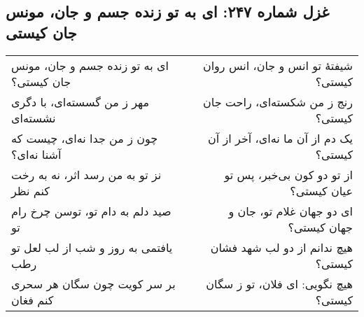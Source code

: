 \begin{center}
\section*{غزل شماره ۲۴۷: ای به تو زنده جسم و جان، مونس جان کیستی}
\label{sec:247}
\begin{longtable}{l p{0.5cm} r}
ای به تو زنده جسم و جان، مونس جان کیستی؟
&&
شیفتهٔ تو انس و جان، انس روان کیستی؟
\\
مهر ز من گسسته‌ای، با دگری نشسته‌ای
&&
رنج ز من شکسته‌ای، راحت جان کیستی؟
\\
چون ز من جدا نه‌ای، چیست که آشنا نه‌ای؟
&&
یک دم از آن ما نه‌ای، آخر از آن کیستی؟
\\
نز تو به من رسد اثر، نه به رخت کنم نظر
&&
از تو دو کون بی‌خبر، پس تو عیان کیستی؟
\\
صید دلم به دام تو، توسن چرخ رام تو
&&
ای دو جهان غلام تو، جان و جهان کیستی؟
\\
یافتمی به روز و شب از لب لعل تو رطب
&&
هیچ ندانم از دو لب شهد فشان کیستی؟
\\
بر سر کویت چون سگان هر سحری کنم فغان
&&
هیچ نگویی: ای فلان، تو ز سگان کیستی؟
\\
\end{longtable}
\end{center}
